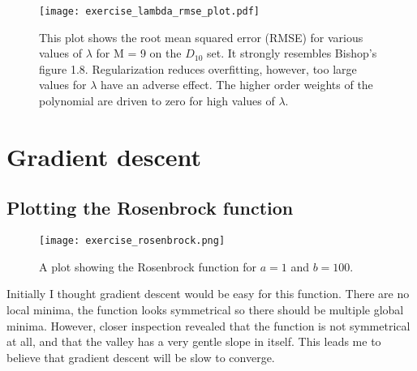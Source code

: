\documentclass[paper=a4, fontsize=10pt]{scrartcl} %
\numberwithin{equation}{section} %
\numberwithin{figure}{section} %
\numberwithin{table}{section} %
\begin{document}
\begin{figure}[H]
	\centering
	\texttt{[image: exercise\_lambda\_rmse\_plot.pdf]}
	\caption{This plot shows the root mean squared error (RMSE) for various values of $\lambda$ for M = 9 on the $D_{10}$ set. It strongly resembles Bishop's figure 1.8. Regularization reduces overfitting, however, too large values for $\lambda$ have an adverse effect. The higher order weights of the polynomial are driven to zero for high values of $\lambda$.}
\end{figure}

\section{Gradient descent}
\subsection{Plotting the Rosenbrock function}
\begin{figure}[H]
	\centering
	\texttt{[image: exercise\_rosenbrock.png]}
	\caption{A plot showing the Rosenbrock function for $a = 1$ and $b = 100$.}
\end{figure}

Initially I thought gradient descent would be easy for this function.
There are no local minima, the function looks symmetrical so there should be multiple global minima.
However, closer inspection revealed that the function is not symmetrical at all, and that the valley has a very gentle slope in itself. This leads me to believe that gradient descent will be slow to converge.
\end{document}
